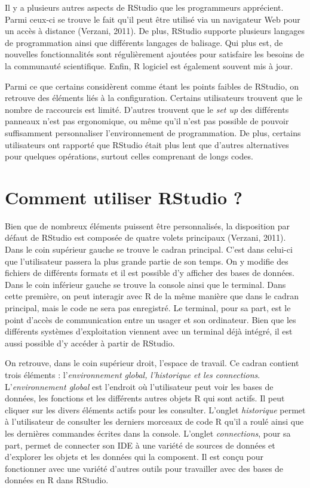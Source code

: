 \documentclass[
  letterpaper,
  DIV=11,
  numbers=noendperiod]{scrreprt}
\begin{document}
Il y a plusieurs autres aspects de RStudio que les programmeurs
apprécient. Parmi ceux-ci se trouve le fait qu'il peut être utilisé via
un navigateur Web pour un accès à distance (Verzani, 2011). De plus,
RStudio supporte plusieurs langages de programmation ainsi que
différents langages de balisage. Qui plus est, de nouvelles
fonctionnalités sont régulièrement ajoutées pour satisfaire les besoins
de la communauté scientifique. Enfin, R logiciel est également souvent
mis à jour.

Parmi ce que certains considèrent comme étant les points faibles de
RStudio, on retrouve des éléments liés à la configuration. Certains
utilisateurs trouvent que le nombre de raccourcis est limité. D'autres
trouvent que le \emph{set up} des différents panneaux n'est pas
ergonomique, ou même qu'il n'est pas possible de pouvoir suffisamment
personnaliser l'environnement de programmation. De plus, certains
utilisateurs ont rapporté que RStudio était plus lent que d'autres
alternatives pour quelques opérations, surtout celles comprenant de
longs codes.

\section{Comment utiliser RStudio ?}\label{comment-utiliser-rstudio}

Bien que de nombreux éléments puissent être personnalisés, la
disposition par défaut de RStudio est composée de quatre volets
principaux (Verzani, 2011). Dans le coin supérieur gauche se trouve le
cadran principal. C'est dans celui-ci que l'utilisateur passera la plus
grande partie de son temps. On y modifie des fichiers de différents
formats et il est possible d'y afficher des bases de données. Dans le
coin inférieur gauche se trouve la console ainsi que le terminal. Dans
cette première, on peut interagir avec R de la même manière que dans le
cadran principal, mais le code ne sera pas enregistré. Le terminal, pour
sa part, est le point d'accès de communication entre un usager et son
ordinateur. Bien que les différents systèmes d'exploitation viennent
avec un terminal déjà intégré, il est aussi possible d'y accéder à
partir de RStudio.

On retrouve, dans le coin supérieur droit, l'espace de travail. Ce
cadran contient trois éléments : l'\emph{environnement global,
l'historique et les connections}. L'\emph{environnement global} est
l'endroit où l'utilisateur peut voir les bases de données, les fonctions
et les différents autres objets R qui sont actifs. Il peut cliquer sur
les divers éléments actifs pour les consulter. L'onglet
\emph{historique} permet à l'utilisateur de consulter les derniers
morceaux de code R qu'il a roulé ainsi que les dernières commandes
écrites dans la console. L'onglet \emph{connections}, pour sa part,
permet de connecter son IDE à une variété de sources de données et
d'explorer les objets et les données qui la composent. Il est conçu pour
fonctionner avec une variété d'autres outils pour travailler avec des
bases de données en R dans RStudio.
\end{document}
